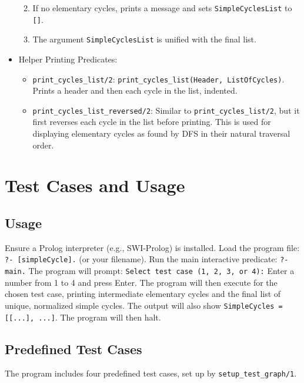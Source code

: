 \documentclass[12pt,a4paper]{article}
\begin{document}
\begin{itemize}
\begin{enumerate}
\begin{itemize}
\end{itemize}
\item If no elementary cycles, prints a message and sets \texttt{SimpleCyclesList} to \texttt{[]}.
\item The argument \texttt{SimpleCyclesList} is unified with the final list.
\end{enumerate}
\item Helper Printing Predicates:
\begin{itemize}
\item \texttt{print\_cycles\_list/2}: \texttt{print\_cycles\_list(Header, ListOfCycles)}. Prints a header and then each cycle in the list, indented.
\item \texttt{print\_cycles\_list\_reversed/2}: Similar to \texttt{print\_cycles\_list/2}, but it first reverses each cycle in the list before printing. This is used for displaying elementary cycles as found by DFS in their natural traversal order.
\end{itemize}
\end{itemize}
\section{Test Cases and Usage}
\subsection{Usage}
Ensure a Prolog interpreter (e.g., SWI-Prolog) is installed.
Load the program file: \texttt{?- [simpleCycle].} (or your filename).
Run the main interactive predicate: \texttt{?- main.}
The program will prompt: \texttt{Select test case (1, 2, 3, or 4):}
Enter a number from 1 to 4 and press Enter.
The program will then execute for the chosen test case, printing intermediate elementary cycles and the final list of unique, normalized simple cycles. The output will also show \texttt{SimpleCycles = [[...], ...]}.
The program will then halt.
\subsection{Predefined Test Cases}
The program includes four predefined test cases, set up by \texttt{setup\_test\_graph/1}.
\end{document}
